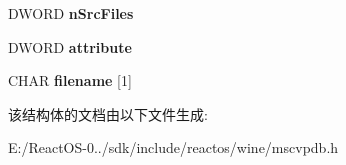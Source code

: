 \begin{DoxyCompactItemize}
\mbox{\label{struct___p_d_b___s_y_m_b_o_l___f_i_l_e_a3e552d943d95dc606ba90e77fc8d984a}} 
D\+W\+O\+RD {\bfseries n\+Src\+Files}
\item 
\mbox{\label{struct___p_d_b___s_y_m_b_o_l___f_i_l_e_a0af58f570fca416a55f81451c5779efd}} 
D\+W\+O\+RD {\bfseries attribute}
\item 
\mbox{\label{struct___p_d_b___s_y_m_b_o_l___f_i_l_e_a47ad04eec301c4215140674d71e9d1ef}} 
C\+H\+AR {\bfseries filename} \mbox{[}1\mbox{]}
\end{DoxyCompactItemize}


该结构体的文档由以下文件生成\+:\begin{DoxyCompactItemize}
\item 
E\+:/\+React\+O\+S-\/0../sdk/include/reactos/wine/mscvpdb.\+h\end{DoxyCompactItemize}
